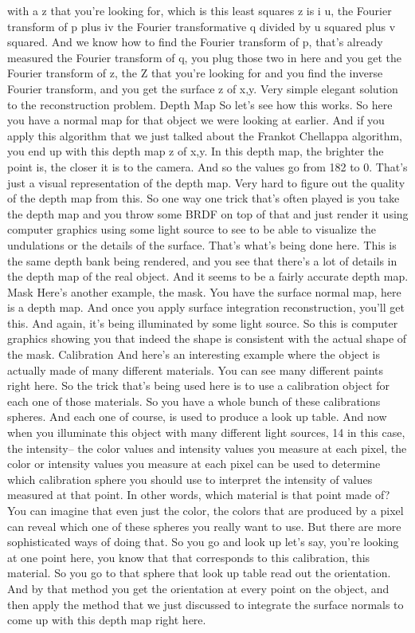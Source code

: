 \documentclass[12pt]{article}
\begin{document}
with a z that you're looking for,
which is this least squares z is i u, the Fourier transform of p
plus iv the Fourier transformative q
divided by u squared plus v squared.
And we know how to find the Fourier transform of p,
that's already measured the Fourier transform of q,
you plug those two in here and you get the Fourier transform
of z, the Z that you're looking for and you find the inverse
Fourier transform, and you get the surface z of x,y.
Very simple elegant solution to the reconstruction problem.
Depth Map
So let's see how this works.
So here you have a normal map for that object
we were looking at earlier.
And if you apply this algorithm that we just talked about
the Frankot Chellappa algorithm, you end up with this depth map
z of x,y.
In this depth map, the brighter the point is,
the closer it is to the camera.
And so the values go from 182 to 0.
That's just a visual representation
of the depth map.
Very hard to figure out the quality of the depth map
from this.
So one way one trick that's often played
is you take the depth map and you throw some BRDF on top of that
and just render it using computer graphics
using some light source to see to be
able to visualize the undulations or the details
of the surface.
That's what's being done here.
This is the same depth bank being rendered,
and you see that there's a lot of details in the depth
map of the real object.
And it seems to be a fairly accurate depth map.
Mask
Here's another example, the mask.
You have the surface normal map, here is a depth map.
And once you apply surface integration reconstruction,
you'll get this.
And again, it's being illuminated
by some light source.
So this is computer graphics showing you
that indeed the shape is consistent with
the actual shape of the mask.
Calibration
And here's an interesting example
where the object is actually made
of many different materials.
You can see many different paints right here.
So the trick that's being used here
is to use a calibration object for each one
of those materials.
So you have a whole bunch of these calibrations spheres.
And each one of course, is used to produce a look up table.
And now when you illuminate this object
with many different light sources, 14 in this case,
the intensity-- the color values and intensity
values you measure at each pixel, the color or intensity
values you measure at each pixel can
be used to determine which calibration sphere
you should use to interpret the intensity of values measured
at that point.
In other words, which material is that point made of?
You can imagine that even just the color, the colors that
are produced by a pixel can reveal
which one of these spheres you really want to use.
But there are more sophisticated ways of doing that.
So you go and look up let's say, you're looking at one point
here, you know that that corresponds
to this calibration, this material.
So you go to that sphere that look up table read out
the orientation.
And by that method you get the orientation
at every point on the object, and then
apply the method that we just discussed
to integrate the surface normals to come up with this depth map
right here.
\end{document}
